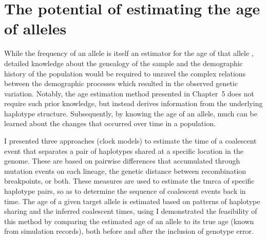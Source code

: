 %
%
%


%
\section{The potential of estimating the age of alleles}
%

While the frequency of an allele is itself an estimator for the age of that allele \citep{Kimura:1973ug,Griffiths:2013ec}, detailed knowledge about the genealogy of the sample and the demographic history of the population would be required to unravel the complex relations between the demographic processes which resulted in the observed genetic variation.
Notably, the age estimation method presented in Chapter~5 does not require such prior knowledge, but instead derives information from the underlying haplotype structure.
Subsequently, by knowing the age of an allele, much can be learned about the changes that occurred over time in a population.

I presented three approaches (clock models) to estimate the time of a coalescent event that separates a pair of haplotypes shared at a specific location in the genome.
These are based on pairwise differences that accumulated through mutation events on each lineage, the genetic distance between recombination breakpoints, or both. These measures are used to estimate the \gls{tmrca} of specific haplotype pairs, so as to determine the sequence of coalescent events back in time.
The age of a given target allele is estimated based on patterns of haplotype sharing and the inferred coalescent times, using 
I demonstrated the feasibility of this method by comparing the estimated age of an allele to its true age (known from simulation records), both before and after the inclusion of genotype error.

